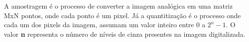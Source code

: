 \begin{question}

  A amostragem é o processo de converter a imagem analógica em 
  uma matriz MxN pontos, onde cada ponto é um pixel. 
  Já a quantitização é o processo onde cada um dos pixels da imagem, assumam 
  um valor inteiro entre 0 a $2^{n}-1$. O valor \textbf{n} representa o 
  número de níveis de cinza presentes na imagem digitalizada.

\end{question}
